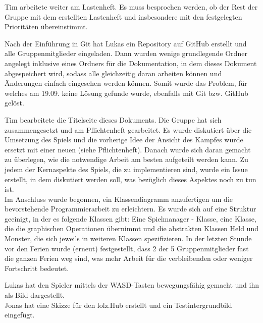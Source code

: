 
Tim arbeitete weiter am Lastenheft. Es muss besprochen werden, ob der Rest der Gruppe mit dem erstellten Lastenheft und insbesondere mit den festgelegten Prioritäten übereinstimmt. \\


Nach der Einführung in Git hat Lukas ein Repository auf GitHub erstellt und alle Gruppenmitglieder eingeladen. Dann wurden wenige grundlegende Ordner angelegt inklusive eines Ordners für die Dokumentation, in dem dieses Dokument abgespeichert wird, sodass alle \glqq{}gleichzeitig\grqq{} daran arbeiten können und Änderungen einfach eingesehen werden können. Somit wurde das Problem, für welches am 19.09. keine Lösung gefunde wurde, ebenfalls mit Git bzw. GitHub gelöst. \\


Tim bearbeitete die Titelseite dieses Dokuments. Die Gruppe hat sich zusammengesetzt und am Pflichtenheft gearbeitet. Es wurde diskutiert über die Umsetzung des Spiels und die vorherige Idee der Ansicht des Kampfes wurde ersetzt mit einer neuen (siehe Pflichtenheft). Danach wurde sich daran gemacht zu überlegen, wie die notwendige Arbeit am besten aufgeteilt werden kann. Zu jedem der Kernaspekte des Spiels, die zu implementieren sind, wurde ein \glqq{}Issue\grqq{} erstellt, in dem diskutiert werden soll, was bezüglich dieses Aspektes noch zu tun ist.\\
Im Anschluss wurde begonnen, ein Klassendiagramm anzufertigen um die bevorstehende Programmierarbeit zu erleichtern. Es wurde sich auf eine Struktur geeinigt, in der es folgende Klassen gibt: Eine \glqq{}Spielmanager\grqq{} - Klasse, eine Klasse, die die graphischen Operationen übernimmt und die abstrakten Klassen Held und Monster, die sich jeweils in weiteren Klassen spezifizieren. In der letzten Stunde vor den Ferien wurde (erneut) festgestellt, dass 2 der 5 Gruppenmitglieder fast die ganzen Ferien weg sind, was mehr Arbeit für die verbleibenden oder weniger Fortschritt bedeutet. \\


Lukas hat den Spieler mittels der WASD-Tasten bewegungsfähig gemacht und ihn als Bild dargestellt. \\
Jonas hat eine Skizze für den lolz.Hub erstellt und ein Testintergrundbild eingefügt. \\

